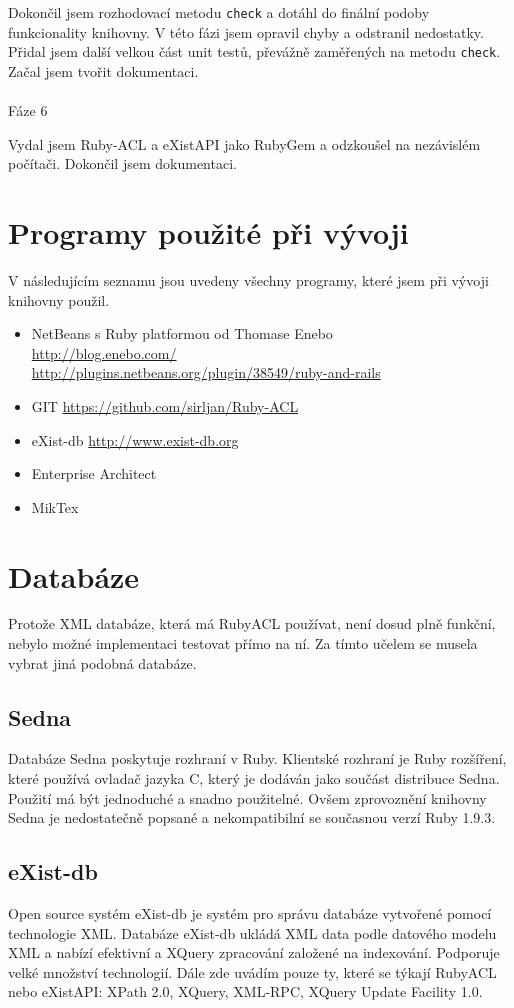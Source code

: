\noindent Dokončil jsem rozhodovací metodu \verb|check| a dotáhl do finální podoby funkcionality knihovny. V této fázi jsem opravil chyby a odstranil nedostatky. Přidal jsem další velkou část unit testů, převážně zaměřených na metodu \verb|check|. Začal jsem tvořit dokumentaci.
\\
\\
\noindent Fáze 6

\noindent Vydal jsem Ruby-ACL a eXistAPI jako RubyGem a odzkoušel na nezávislém počítači. Dokončil jsem dokumentaci. 


\section{Programy použité při vývoji}
V následujícím seznamu jsou uvedeny všechny programy, které jsem při vývoji knihovny použil.
\begin{itemize}
\item NetBeans s Ruby platformou od Thomase Enebo
\\
\url{http://blog.enebo.com/}
\\
\url{http://plugins.netbeans.org/plugin/38549/ruby-and-rails}
\item GIT
\url{https://github.com/sirljan/Ruby-ACL}
\item eXist-db
\url{http://www.exist-db.org}
\item Enterprise Architect
\item MikTex
\end{itemize}
\section{Databáze}
Protože XML databáze, která má RubyACL používat, není dosud plně funkční, nebylo možné implementaci testovat přímo na ní. Za tímto učelem se musela vybrat jiná podobná databáze.

\subsection{Sedna}
Databáze Sedna poskytuje rozhraní v Ruby. Klientské rozhraní je Ruby rozšíření, které používá ovladač jazyka C, který je dodáván jako součást distribuce Sedna. Použití má být jednoduché a snadno použitelné. Ovšem zprovoznění knihovny Sedna je nedostatečně popsané a nekompatibilní se současnou verzí Ruby 1.9.3.

\subsection{eXist-db}
Open source systém eXist-db je systém pro správu databáze vytvořené pomocí technologie XML. Databáze eXist-db ukládá XML data podle datového modelu XML a nabízí efektivní a XQuery zpracování založené na indexování. Podporuje velké množství technologií. Dále zde uvádím pouze ty, které se týkají RubyACL nebo eXistAPI: XPath 2.0, XQuery, XML-RPC, XQuery Update Facility 1.0. 


